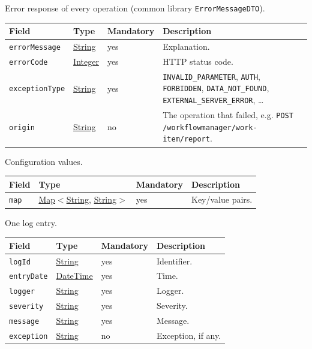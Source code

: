 \documentclass[a4paper]{arrowhead}
\newcommand{\pref}[1]{{\textcolor{ArrowheadGrey}{\hyperref[sec:model:primitives:#1]{#1}}}}
\begin{document}
Error response of every operation (common library \texttt{Error\allowbreak{}MessageDTO}).

{\small
\begin{longtable}{|p{3.7cm}|p{4.2cm}|p{1.6cm}|p{6.3cm}|}

\hline
\rowcolor{gray!33} Field & Type & Mandatory & Description \\ \hline
\endhead
\texttt{errorMessage} & \pref{String} & yes & Explanation. \\ \hline
\texttt{errorCode} & \pref{Integer} & yes & HTTP status code. \\ \hline
\texttt{exceptionType} & \pref{String} & yes & \texttt{INVALID\_\allowbreak{}PARAMETER}, \texttt{AUTH}, \texttt{FORBIDDEN}, \texttt{DATA\_\allowbreak{}NOT\_\allowbreak{}FOUND}, \texttt{EXTERNAL\_\allowbreak{}SERVER\_\allowbreak{}ERROR}, \ldots \\ \hline
\texttt{origin} & \pref{String} & no & The operation that failed, e.g. \texttt{POST /\allowbreak{}workflowmanager/\allowbreak{}work-\allowbreak{}item/\allowbreak{}report}. \\ \hline
\end{longtable}
}

Configuration values.

{\small
\begin{longtable}{|p{3.7cm}|p{4.2cm}|p{1.6cm}|p{6.3cm}|}

\hline
\rowcolor{gray!33} Field & Type & Mandatory & Description \\ \hline
\endhead
\texttt{map} & \pref{Map}$<$\pref{String}, \pref{String}$>$ & yes & Key/value pairs. \\ \hline
\end{longtable}
}

One log entry.

{\small
\begin{longtable}{|p{3.7cm}|p{4.2cm}|p{1.6cm}|p{6.3cm}|}

\hline
\rowcolor{gray!33} Field & Type & Mandatory & Description \\ \hline
\endhead
\texttt{logId} & \pref{String} & yes & Identifier. \\ \hline
\texttt{entryDate} & \pref{DateTime} & yes & Time. \\ \hline
\texttt{logger} & \pref{String} & yes & Logger. \\ \hline
\texttt{severity} & \pref{String} & yes & Severity. \\ \hline
\texttt{message} & \pref{String} & yes & Message. \\ \hline
\texttt{exception} & \pref{String} & no & Exception, if any. \\ \hline
\end{longtable}
}
\end{document}
